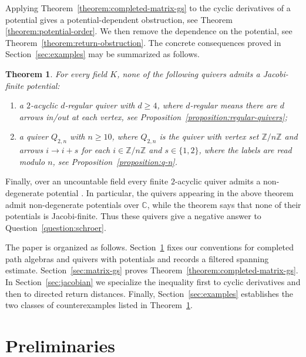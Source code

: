 \documentclass[11pt,letterpaper,reqno]{amsart}
\newtheorem{theorem}{Theorem}[section]
\theoremstyle{definition}
\begin{document}
	
	Applying Theorem~\ref{theorem:completed-matrix-gs} to the cyclic derivatives
	of a potential gives a potential-dependent obstruction, see Theorem \ref{theorem:potential-order}.  We then remove the
	dependence on the potential, see
	Theorem~\ref{theorem:return-obstruction}.
	The concrete consequences proved in Section~\ref{sec:examples} may be
	summarized as follows.
	
	\begin{theorem}
		\label{theorem:main-counterexamples}
		For every field $K$, none of the following quivers admits a Jacobi-finite
		potential:
		\begin{enumerate}[label=\textup{(\roman*)},leftmargin=2.2em]
        \item a $2$-acyclic $d$-regular quiver with $d\geq4$, where $d$-regular means there are $d$ arrows in/out at each vertex, see Proposition~\ref{proposition:regular-quivers};
			\item a quiver $Q_{2,n}$ with $n\geq 10$, where $Q_{2,n}$ is the quiver with vertex set $\mathbb Z/n\mathbb Z$ and arrows $i\longrightarrow i+s$ for each $i\in\mathbb Z/n\mathbb Z$ and $s\in\{1,2\}$, where the labels are read modulo $n$, see Proposition~\ref{proposition:q-n}.\end{enumerate}
	\end{theorem}
	

	Finally, over an uncountable field every finite $2$-acyclic quiver admits
	a non-degenerate potential
	\cite[Corollary~7.4]{DerksenWeymanZelevinsky}.  In particular,
	the quivers appearing in the above theorem admit non-degenerate potentials over $\mathbb C$, while the theorem says that none of their potentials is Jacobi-finite.
	Thus these quivers give a negative answer to Question~\ref{question:schroer}.	
	
	The paper is organized as follows.  Section~\ref{sec:preliminaries} fixes our
	conventions for completed path algebras and quivers with potentials and
	records a filtered spanning estimate.  Section~\ref{sec:matrix-gs} proves
	Theorem~\ref{theorem:completed-matrix-gs}.  In
	Section~\ref{sec:jacobian} we specialize the inequality first to cyclic
	derivatives and then to directed return distances.  Finally,
	Section~\ref{sec:examples} establishes the two classes of counterexamples
	listed in Theorem~\ref{theorem:main-counterexamples}.
	
	\section{Preliminaries}
	\label{sec:preliminaries}
	
\end{document}
